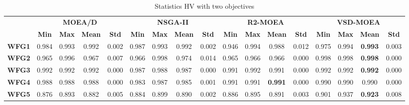 \begin{table*}
\centering
\caption{Statistics HV with two objectives}
\label{tab:StatisticsHV_2obj}
\begin{tabular}{|c|c|c|c|c|c|c|c|c|c|c|c|c|c|c|c|c|} 
\cline{2-17}
\multicolumn{1}{c|}{} & \multicolumn{4}{c|}{\textbf{MOEA/D} }                                 & \multicolumn{4}{c|}{\textbf{NSGA-II} }                                & \multicolumn{4}{c|}{\textbf{R2-MOEA} }                                & \multicolumn{4}{c|}{\textbf{VSD-MOEA} }                                \\ 
\cline{2-17}
\multicolumn{1}{c|}{} & \textbf{Min}    & \textbf{Max}    & \textbf{Mean}   & \textbf{Std}    & \textbf{Min}    & \textbf{Max}    & \textbf{Mean}   & \textbf{Std}    & \textbf{Min}    & \textbf{Max}    & \textbf{Mean}   & \textbf{Std}    & \textbf{Min}    & \textbf{Max}    & \textbf{Mean}   & \textbf{Std}     \\ 
\hline
\textbf{WFG1}         & 0.984           & 0.993           & 0.992           & 0.002           & 0.987           & 0.993           & 0.992           & 0.002           & 0.946           & 0.994           & 0.988           & 0.012           & 0.975           & 0.994           & \textbf{0.993 } & 0.003            \\ 
\hline
\textbf{WFG2}         & 0.965           & 0.996           & 0.967           & 0.007           & 0.966           & 0.998           & 0.974           & 0.014           & 0.965           & 0.966           & 0.966           & 0.000           & 0.998           & 0.998           & \textbf{0.998 } & 0.000            \\ 
\hline
\textbf{WFG3}         & 0.992           & 0.992           & 0.992           & 0.000           & 0.987           & 0.988           & 0.987           & 0.000           & 0.991           & 0.992           & 0.991           & 0.000           & 0.992           & 0.992           & \textbf{0.992 } & 0.000            \\ 
\hline
\textbf{WFG4}         & 0.988           & 0.988           & 0.988           & 0.000           & 0.983           & 0.987           & 0.985           & 0.001           & 0.991           & 0.991           & \textbf{0.991 } & 0.000           & 0.990           & 0.990           & 0.990           & 0.000            \\ 
\hline
\textbf{WFG5}         & 0.876           & 0.893           & 0.882           & 0.005           & 0.884           & 0.899           & 0.890           & 0.002           & 0.886           & 0.895           & 0.891           & 0.003           & 0.901           & 0.937           & \textbf{0.923 } & 0.008            \\ 

\end{tabular}
\end{table*}
